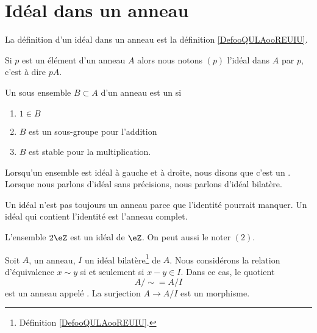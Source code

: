 \section{Idéal dans un anneau}

La définition d'un idéal dans un anneau est la définition \ref{DefooQULAooREUIU}.


\begin{definition}  \label{DefSKTooOTauAR}
    Si \( p\) est un élément d'un anneau \( A\) alors nous notons \( (p)\) l'idéal dans \( A\)  par \( p\), c'est à dire \( pA\).
\end{definition}

\begin{definition}  \label{DefAJVTPxb}
    Un sous ensemble \( B\subset A\) d'un anneau est un  si
    \begin{enumerate}
        \item
            \( 1\in B\)
        \item
            \( B\) est un sous-groupe pour l'addition
        \item
            \( B\) est stable pour la multiplication.
    \end{enumerate}
\end{definition}

Lorsqu'un ensemble est idéal à gauche et à droite, nous disons que c'est un . Lorsque nous parlons d'idéal sans précisions, nous parlons d'idéal bilatère.

\begin{remark}
    Un idéal n'est pas toujours un anneau parce que l'identité pourrait manquer. Un idéal qui contient l'identité est l'anneau complet.
\end{remark}

\begin{example}
    L'ensemble \( 2\eZ\) est un idéal de \( \eZ\). On peut aussi le noter \( (2) \).
\end{example}

Soit \( A\), un anneau, \( I\) un idéal bilatère\footnote{Définition \ref{DefooQULAooREUIU}.} de \( A\). Nous considérons la relation d'équivalence \( x\sim y\) si et seulement si \( x-y\in I\). Dans ce cas, le quotient
\begin{equation}
    A/\sim=A/I
\end{equation}
est un anneau appelé . La surjection \( A\to A/I\) est un morphisme.

